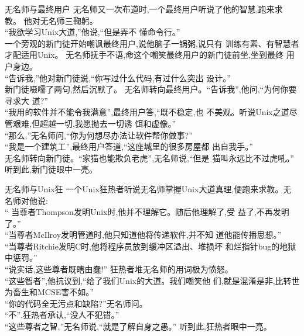 \begin{frame}[shrink=5]{无名师与最终用户}
无名师又一次布道时,一个最终用户听说了他的智慧,跑来求 教。 他对无名师三鞠躬。\\
“我欲学习Unix大道,”他说,“但是弄不 懂命令行。”\\
 一个旁观的新门徒开始嘲讽最终用户,说他脑子一锅粥,说只有 训练有素、有智慧者才配适用Unix。 无名师抚手不语,命这个嘲笑最终用户的新门徒前坐,坐到最终 用户身边。 \\
 “告诉我,”他对新门徒说,“你写过什么代码,有过什么突出 设计。”\\
新门徒嗫嚅了两句,然后沉默了。 无名师转向最终用户。“告诉我”,他问,“为何你要寻求大 道?”\\
“我用的软件并不能令我满意”,最终用户答,“既不稳定,也 不美观。听说Unix之道尽管艰难,但超越一切,我愿抛去一切诱 饵和虚像。” \\
“那么,”无名师问,“你为何想尽办法让软件帮你做事?” \\
“我是一个建筑工”,最终用户答道,“这座城里的很多房屋都 出自我手。” \\
无名师转向新门徒。“家猫也能欺负老虎”,无名师说,“但是 猫叫永远比不过虎吼。” \\
听到此,新门徒眼中一亮。
\end{frame}

\begin{frame}[shrink]{无名师与Unix狂}
一个Unix狂热者听说无名师掌握Unix大道真理,便跑来求教。无 名师对他说: \\
“ 当尊者Thompson发明Unix时,他并不理解它。随后他理解了,受 益了,不再发明了。”  \\
“当尊者McIlroy发明管道时,他只知道他将传递软件,并不知 道他能传播思想。” \\
“当尊者Ritchie发明C时,他将程序员放到缓冲区溢出、堆损坏 和烂指针bug的地狱中惩罚。”\\
“说实话,这些尊者既瞎由蠢!” 狂热者堆无名师的用词极为愤怒。\\
 “这些智者”,他抗议到,“给了我们Unix的大道。我们嘲笑他 们,就是混淆是非,比转世为畜生和MCSE害不如。”\\
  “你的代码全无污点和缺陷?”无名师问。\\
   “不”,狂热者承认,“没人不犯错。”\\
   “这些尊者之智,”无名师说,“就是了解自身之愚。” 听到此,狂热者眼中一亮。
\end{frame}

